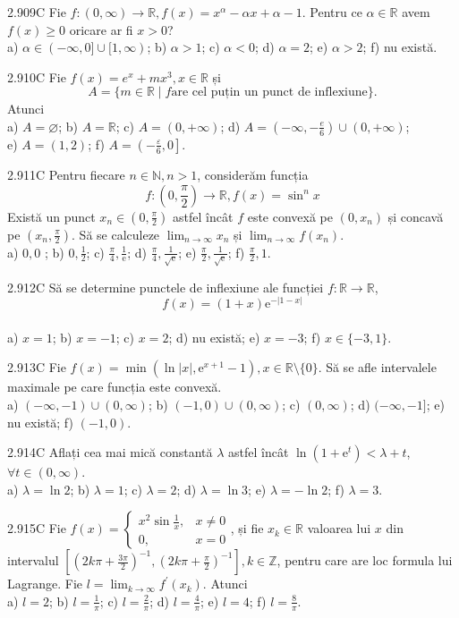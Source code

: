 \documentclass[11pt]{article}
\begin{document}
2.909C Fie $f:(0, \infty) \rightarrow \mathbb{R}, f(x)=x^{\alpha}-\alpha x+\alpha-1$. Pentru ce $\alpha \in \mathbb{R}$ avem $f(x) \geq 0$ oricare ar fi $x>0$?\\ a) $\alpha \in(-\infty, 0] \cup[1, \infty)$; b) $\alpha>1$; c) $\alpha<0$; d) $\alpha=2$; e) $\alpha>2$; f) nu există.

2.910C Fie $f(x)=e^{x}+m x^{3}, x \in \mathbb{R}$ și $$A=\{m \in \mathbb{R} \mid f \text{are cel puțin un punct de inflexiune}\}.$$ Atunci\\ a) $A=\varnothing$; b) $A=\mathbb{R}$; c) $A=(0,+\infty)$; d) $A=\left(-\infty,-\frac{e}{6}\right) \cup(0,+\infty)$;\\ e) $A=(1,2)$; f) $A=\left(-\frac{\varepsilon}{6}, 0\right]$.

2.911C Pentru fiecare $n \in \mathbb{N}, n>1$, considerăm funcția $$f:\left(0, \frac{\pi}{2}\right) \rightarrow \mathbb{R}, f(x)=\sin ^{n} x$$ Există un punct $x_{n} \in\left(0, \frac{\pi}{2}\right)$ astfel încât $f$ este convexă pe $\left(0, x_{n}\right)$ și concavă pe $\left(x_{n}, \frac{\pi}{2}\right)$. Să se calculeze $\lim _{n \rightarrow \infty} x_{n}$ și $\lim _{n \rightarrow \infty} f\left(x_{n}\right)$.\\ a) $0,0$ ; b) $0, \frac{1}{2}$; c) $\frac{\pi}{4}, \frac{1}{\mathrm{e}}$; d) $\frac{\pi}{4}, \frac{1}{\sqrt{\mathrm{e}}}$; e) $\frac{\pi}{2}, \frac{1}{\sqrt{\mathrm{e}}}$; f) $\frac{\pi}{2}, 1$.

2.912C Să se determine punctele de inflexiune ale funcției $f: \mathbb{R} \rightarrow \mathbb{R}$, $$f(x)=(1+x) \mathrm{e}^{-|1-x|}$$\\ a) $x=1$; b) $x=-1$; c) $x=2$; d) nu există; e) $x=-3$; f) $x \in\{-3,1\}$.

2.913C Fie $f(x)=\min \left(\ln |x|, \mathrm{e}^{x+1}-1\right), x \in \mathbb{R} \setminus\{0\}$. Să se afle intervalele maximale pe care funcția este convexă.\\ a) $(-\infty,-1) \cup(0, \infty)$; b) $(-1,0) \cup(0, \infty)$; c) $(0, \infty)$; d) $(-\infty,-1]$; e) nu există; f) $(-1,0)$. 

2.914C Aflați cea mai mică constantă $\lambda$ astfel încât $\ln \left(1+\mathrm{e}^{t}\right)<\lambda+t$,$\forall t \in(0, \infty)$.\\ a) $\lambda=\ln 2$; b) $\lambda=1$; c) $\lambda=2$; d) $\lambda=\ln 3$; e) $\lambda=-\ln 2$; f) $\lambda=3$.

2.915C Fie $f(x)=\left\{\begin{array}{ll}x^{2} \sin \frac{1}{x}, & x \neq 0 \\ 0, & x=0\end{array}\right.$, și fie $x_{k} \in \mathbb{R}$ valoarea lui $x$ din intervalul $\left[\left(2 k \pi+\frac{3 \pi}{2}\right)^{-1},\left(2 k \pi+\frac{\pi}{2}\right)^{-1}\right], k \in \mathbb{Z}$, pentru care are loc formula lui Lagrange. Fie $l=\lim _{k \rightarrow \infty} f^{\prime}\left(x_{k}\right)$. Atunci\\ a) $l=2$; b) $l=\frac{1}{\pi}$; c) $l=\frac{2}{\pi}$; d) $l=\frac{4}{\pi}$; e) $l=4$; f) $l=\frac{8}{\pi}$.
\end{document}
